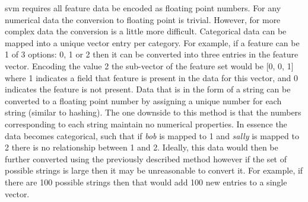 
        

\gls{svm} requires all feature data be encoded as floating point numbers. For any numerical data the conversion to floating point is trivial. However, for more complex data the conversion is a little more difficult. Categorical data can be mapped into a unique vector entry per category. For example, if a feature can be 1 of 3 options: 0, 1 or 2 then it can be converted into three entries in the feature vector. Encoding the value 2 the sub-vector of the feature set would be [0, 0, 1] where 1 indicates a field that feature is present in the data for this vector, and 0 indicates the feature is not present. Data that is in the form of a string can be converted to a floating point number by assigning a unique number for each string (similar to hashing). The one downside to this method is that the numbers corresponding to each string maintain no numerical properties. In essence the data becomes categorical, such that if \textit{bob} is mapped to 1 and \textit{sally} is mapped to 2 there is no relationship between 1 and 2. Ideally, this data would then be further converted using the previously described method however if the set of possible strings is large then it may be unreasonable to convert it. For example, if there are 100 possible strings then that would add 100 new entries to a single vector.


